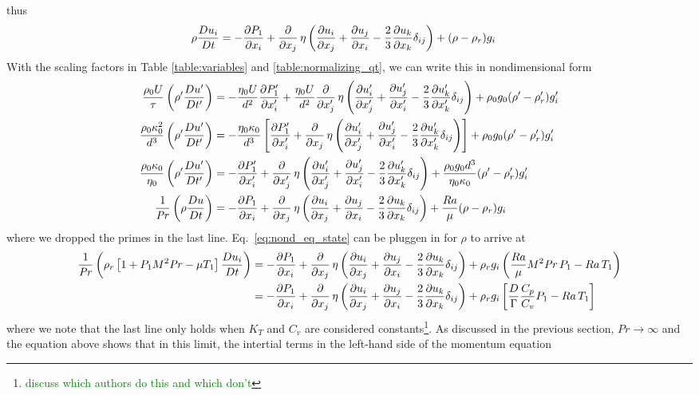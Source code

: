 \documentclass[a4paper]{article}
\newcommand{\mdv}[2]{\frac{D #1}{D #2}}
\begin{document}
thus 
\begin{align*}
    \rho\mdv{u_i}{t} &= -\pdv{P_1}{x_i} + \pdv{x_j}\, \eta \left( \pdv{u_i}{x_j} + \pdv{u_j}{x_i} -\frac{2}{3}\pdv{u_k}{x_k}\delta_{ij}\right)  + (\rho-\rho_r) g_i
\end{align*}
With the scaling factors in Table \ref{table:variables} and \ref{table:normalizing_qt}, we can write this in nondimensional form
\begin{align*}
    \frac{\rho_0U}{\tau}\left(\rho'\mdv{u'}{t'}\right)&=-\frac{\eta_0U}{d^2}\pdv{P_1'}{x_i'}+\frac{\eta_0U}{d^2}\pdv{x'_j}\,\eta \left( \pdv{u'_i}{x'_j} 
    + \pdv{u'_j}{x'_i} -\frac{2}{3}\pdv{u'_k}{x'_k}\delta_{ij}\right)  + \rho_0g_0(\rho'-\rho'_r) g_i'\\
    \frac{\rho_0\kappa_0^2}{d^3} \left(\rho'\mdv{u'}{t'}\right)&= -\frac{\eta_0\kappa_0}{d^3}\left[\pdv{P_1'}{x_i'}+\pdv{x_j}\,\eta \left( \pdv{u'_i}{x'_j} 
    + \pdv{u'_j}{x'_i} -\frac{2}{3}\pdv{u'_k}{x'_k}\delta_{ij}\right)\right] + \rho_0g_0(\rho'-\rho'_r) g_i'\\
    \frac{\rho_0\kappa_0}{\eta_0} \left(\rho'\mdv{u'}{t'}\right)&= -\pdv{P_1'}{x_i'}+\pdv{x'_j}\,\eta \left( \pdv{u'_i}{x'_j} 
    + \pdv{u'_j}{x'_i} -\frac{2}{3}\pdv{u'_k}{x'_k}\delta_{ij}\right) + \frac{\rho_0g_0d^3}{\eta_0\kappa_0}(\rho'-\rho'_r) g_i'\\
    \frac{1}{\mathit{Pr}} \left(\rho\mdv{u}{t}\right)&= -\pdv{P_1}{x_i}+\pdv{x_j}\,\eta \left( \pdv{u_i}{x_j} 
    + \pdv{u_j}{x_i} -\frac{2}{3}\pdv{u_k}{x_k}\delta_{ij}\right) + \frac{Ra}{\mu}(\rho-\rho_r) g_i\\
\end{align*}
where we dropped the primes in the last line. Eq.~\eqref{eq:nond_eq_state} can be pluggen in for $\rho$ to arrive at
\begin{align*}
    \frac{1}{\mathit{Pr}}\left(\rho_r\left[1+P_1M^2\mathit{Pr}-\mu T_1\right]\mdv{u_i}{t}\right)&= -\pdv{P_1}{x_i}+\pdv{x_j}\,\eta\left(\pdv{u_i}{x_j}+\pdv{u_j}{x_i}-\frac{2}{3}\pdv{u_k}{x_k}\delta_{ij}\right)
    +\rho_r g_i\left(\frac{Ra}{\mu}M^2\mathit{Pr}\,P_1-Ra\,T_1\right)\\
    &= -\pdv{P_1}{x_i}+\pdv{x_j}\,\eta\left(\pdv{u_i}{x_j}+\pdv{u_j}{x_i}-\frac{2}{3}\pdv{u_k}{x_k}\delta_{ij}\right)+\rho_r g_i\left[\frac{D}{\Gamma}\frac{C_p}{C_v}P_1-Ra\,T_1\right]
\end{align*}
where we note that the last line only holds when $K_T$ and $C_v$ are considered constants\footnote{\textcolor{green}{discuss which authors do this and which don't}}. 
As discussed in the previous section, $\mathit{Pr} \to \infty$ and the equation above shows that in this limit, the intertial terms in the left-hand side of the momentum equation
\end{document}
